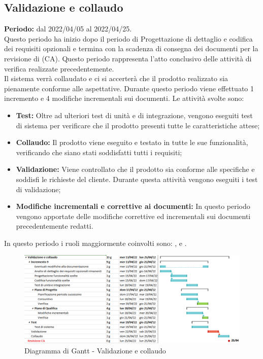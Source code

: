 
\subsection{Validazione e collaudo} \label{subsection:pianificazione_validazione}
\textbf{Periodo:} dal 2022/04/05 al 2022/04/25.
\bigskip
\\Questo periodo ha inizio dopo il periodo di Progettazione di dettaglio e codifica dei requisiti opzionali e termina con la scadenza di consegna dei documenti per la revisione di \CA{} (CA\glo{}).
Questo periodo rappresenta l'atto conclusivo delle attività di verifica realizzate precedentemente.
\\Il sistema verrà collaudato e ci si accerterà che il prodotto realizzato
sia pienamente conforme alle aspettative.
Durante questo periodo viene effettuato 1 incremento e 4 modifiche incrementali sui documenti.
Le attività svolte sono:
\begin{itemize}
  \item \textbf{Test:} Oltre ad ulteriori test di unità e di integrazione, vengono eseguiti test di sistema per verificare che il prodotto presenti tutte le caratteristiche attese;
  \item \textbf{Collaudo:} Il prodotto viene eseguito e testato in tutte le sue funzionalità, verificando che siano stati soddisfatti tutti i requisiti;
  \item \textbf{Validazione:} Viene controllato che il prodotto sia conforme alle specifiche e soddisfi le richieste del cliente.
        Durante questa attività vengono eseguiti i test di validazione;
  \item \textbf{Modifiche incrementali e correttive ai documenti:} In questo periodo vengono apportate delle modifiche correttive ed incrementali sui documenti precedentemente redatti.
\end{itemize}
In questo periodo i ruoli maggiormente coinvolti sono: \roleDesignerLow{}, \roleProgrammerLow{} e \roleVerifierLow{}.
\bigskip
\begin{figure}[H]
  \centering
  \includegraphics[scale=0.54]{immagini/validazione_collaudo.png}
  \caption{Diagramma di Gantt - Validazione e collaudo}
\end{figure}
\pagebreak